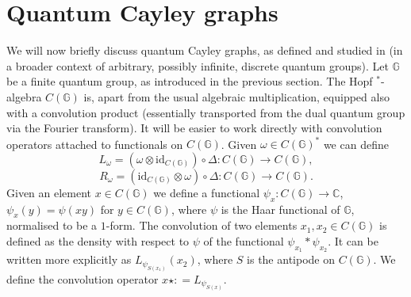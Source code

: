 \documentclass[12pt]{amsart}
\theoremstyle{definition}
\theoremstyle{definition}
\theoremstyle{definition}
\theoremstyle{definition}
\newcommand{\id}{\mathrm{id}}
\newcommand{\G}{\mathbb{G}}
\newcommand{\C}{\mathbb{C}}
\numberwithin{equation}{section}
\begin{document}
\section{Quantum Cayley graphs}
\label{sec.step1}

We will now briefly discuss quantum Cayley graphs, as defined and studied in \cite{Was24} (in a broader context of arbitrary, possibly infinite, discrete quantum groups).  
Let $\G$ be a finite quantum group, as introduced in the previous section. 
The Hopf $^*$-algebra $C(\G)$ is, apart from the usual algebraic multiplication, equipped also with a convolution product (essentially transported from the dual quantum group via the Fourier transform). It will be easier to work directly with convolution operators attached to functionals on $C(\G)$. Given $\omega \in C(\G)^*$ we can define 
\[ L_\omega = (\omega \otimes \id_{C(\G)}) \circ \Delta: C(\G) \to C(\G),\]
\[ R_\omega = (\id_{C(\G)} \otimes \omega) \circ \Delta: C(\G) \to C(\G).\]
Given an element $x \in C(\G)$ we define a functional $\psi_x: C(\G) \to \C$, $\psi_x(y) = \psi(xy)$ for $y \in C(\G)$, where $\psi$ is the Haar functional of $\G$, normalised to be a $1$-form. The convolution of two elements $x_1, x_2 \in C(\G)$ is defined as the density with respect to $\psi$ of the functional $\psi_{x_1}\ast \psi_{x_2}$. It can be written more explicitly as $L_{\psi_{S(x_1)}}(x_2)$, where $S$ is the antipode on $C(\G)$. We define the convolution operator $x \star: = L_{\psi_{S(x)}}$.  
\end{document}
